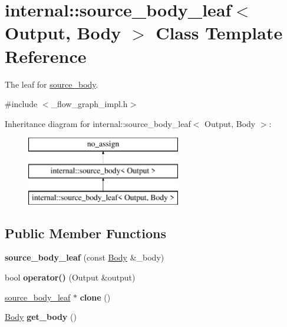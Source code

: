 \hypertarget{classinternal_1_1source__body__leaf}{}\section{internal\+:\+:source\+\_\+body\+\_\+leaf$<$ Output, Body $>$ Class Template Reference}
\label{classinternal_1_1source__body__leaf}


The leaf for \hyperlink{classinternal_1_1source__body}{source\+\_\+body}.  




{\ttfamily \#include $<$\+\_\+flow\+\_\+graph\+\_\+impl.\+h$>$}

Inheritance diagram for internal\+:\+:source\+\_\+body\+\_\+leaf$<$ Output, Body $>$\+:\begin{figure}[H]
\begin{center}
\leavevmode
\includegraphics[height=3.000000cm]{classinternal_1_1source__body__leaf}
\end{center}
\end{figure}
\subsection*{Public Member Functions}
\begin{DoxyCompactItemize}
\item 
\hypertarget{classinternal_1_1source__body__leaf_a6f59c636e24355f254c98900937e6cea}{}{\bfseries source\+\_\+body\+\_\+leaf} (const \hyperlink{classBody}{Body} \&\+\_\+body)\label{classinternal_1_1source__body__leaf_a6f59c636e24355f254c98900937e6cea}

\item 
\hypertarget{classinternal_1_1source__body__leaf_ab9dba4d53689e0a829e493e053ace177}{}bool {\bfseries operator()} (Output \&output)\label{classinternal_1_1source__body__leaf_ab9dba4d53689e0a829e493e053ace177}

\item 
\hypertarget{classinternal_1_1source__body__leaf_a4f92fb28735d41cf3c4bb9ac3ae3e453}{}\hyperlink{classinternal_1_1source__body__leaf}{source\+\_\+body\+\_\+leaf} $\ast$ {\bfseries clone} ()\label{classinternal_1_1source__body__leaf_a4f92fb28735d41cf3c4bb9ac3ae3e453}

\item 
\hypertarget{classinternal_1_1source__body__leaf_a8f4582d32606b9053fe55c24459586aa}{}\hyperlink{classBody}{Body} {\bfseries get\+\_\+body} ()\label{classinternal_1_1source__body__leaf_a8f4582d32606b9053fe55c24459586aa}

\end{DoxyCompactItemize}


